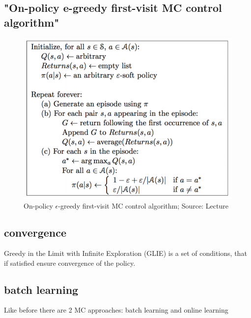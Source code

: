 \subsection{"On-policy e-greedy first-visit MC control algorithm"}
\begin{figure}[h!]
  \centering
  \includegraphics[scale=0.5]{figures/fv_greedy_mc_control.PNG}
  \caption{On-policy $\epsilon$-greedy first-visit MC control algorithm; Source: Lecture}
  \label{fig:fv_mc_greedy}
\end{figure}
\newpage
\subsection{convergence}

Greedy in the Limit with Infinite Exploration (GLIE) is a set of conditions, that if satisfied ensure convergence of the policy. 

\subsection{batch learning}

Like before there are 2 MC approaches: batch learning and online learning

